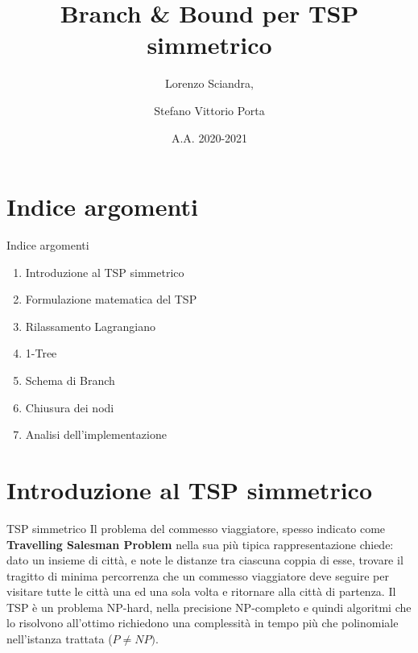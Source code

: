 \documentclass[10pt]{beamer}
\title{Branch \& Bound per TSP simmetrico}
\author{Lorenzo Sciandra, \and Stefano Vittorio Porta}
\date{A.A. 2020-2021}
\institute{Università degli Studi di Torino}
\begin{document}
\maketitle

\section{Indice argomenti}

\begin{frame}{Indice argomenti}
    \begin{enumerate}
        \item Introduzione al TSP simmetrico
        \item Formulazione matematica del TSP
        \item Rilassamento Lagrangiano
        \item 1-Tree
        \item Schema di Branch
        \item Chiusura dei nodi
        \item Analisi dell'implementazione
    \end{enumerate}
\end{frame}

\section{Introduzione al TSP simmetrico}
\begin{frame}{TSP simmetrico}
    Il problema del commesso viaggiatore, spesso indicato come \textbf{Travelling Salesman Problem} nella sua più tipica rappresentazione chiede: dato un insieme di città, e note le distanze tra ciascuna coppia di esse, trovare il tragitto di minima percorrenza che un commesso viaggiatore deve seguire per visitare tutte le città una ed una sola volta e ritornare alla città di partenza.
    \newline
    \newline
    Il TSP è un problema NP-hard, nella precisione NP-completo e quindi algoritmi che lo risolvono all'ottimo richiedono una complessità in tempo più che polinomiale nell'istanza trattata ($P \neq NP)$.
\end{frame}
\end{document}
